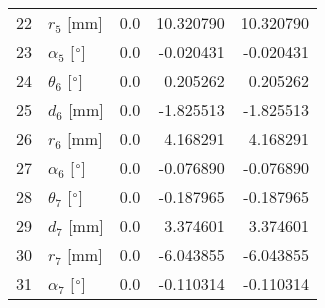 \documentclass{standalone}%
\begin{document}
\begin{tabular}{llrrr}
22 &              $r_{5}$ [mm] &       0.0 &  10.320790 &  10.320790 \\
23 &  $\alpha_{5}$ [$\degree$] &       0.0 &  -0.020431 &  -0.020431 \\
24 &  $\theta_{6}$ [$\degree$] &       0.0 &   0.205262 &   0.205262 \\
25 &              $d_{6}$ [mm] &       0.0 &  -1.825513 &  -1.825513 \\
26 &              $r_{6}$ [mm] &       0.0 &   4.168291 &   4.168291 \\
27 &  $\alpha_{6}$ [$\degree$] &       0.0 &  -0.076890 &  -0.076890 \\
28 &  $\theta_{7}$ [$\degree$] &       0.0 &  -0.187965 &  -0.187965 \\
29 &              $d_{7}$ [mm] &       0.0 &   3.374601 &   3.374601 \\
30 &              $r_{7}$ [mm] &       0.0 &  -6.043855 &  -6.043855 \\
31 &  $\alpha_{7}$ [$\degree$] &       0.0 &  -0.110314 &  -0.110314 \\
\bottomrule
\end{tabular}
%
\end{document}
